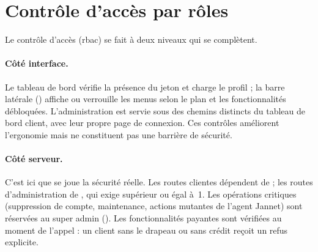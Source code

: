 \section{Contrôle d'accès par rôles}
Le contrôle d'accès (\gls{rbac}) se fait à deux niveaux qui se complètent.

\paragraph{Côté interface.} Le tableau de bord vérifie la présence du jeton et charge le profil ; la barre latérale () affiche ou verrouille les menus selon le plan et les fonctionnalités débloquées. L'administration est servie sous des chemins distincts du tableau de bord client, avec leur propre page de connexion. Ces contrôles améliorent l'ergonomie mais ne constituent pas une barrière de sécurité.

\paragraph{Côté serveur.} C'est ici que se joue la sécurité réelle. Les routes clientes dépendent de  ; les routes d'administration de , qui exige  supérieur ou égal à~1. Les opérations critiques (suppression de compte, maintenance, actions mutantes de l'agent Jannet) sont réservées au super admin (). Les fonctionnalités payantes sont vérifiées au moment de l'appel : un client sans le drapeau  ou sans crédit reçoit un refus explicite.

